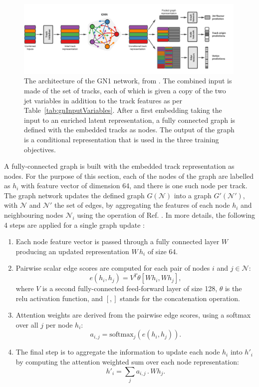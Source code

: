 \begin{figure}[h!]
  \center
  \includegraphics[width=0.99\textwidth]{Images/FTAG/GN/Intro/gnn_architecture.png}
  \caption{The architecture of the GN1 network, from \cite{ATL-PHYS-PUB-2022-027}. The combined input is made of the set of tracks, each of which is given a copy of the two jet variables in addition to the track features as per Table~\ref{tab:gnInputVariables}. After a first embedding taking the input to an enriched latent representation, a fully connected graph is defined with the embedded tracks as nodes. The output of the graph is a conditional representation that is used in the three training objectives.} 
  \label{fig:gnnArchitecture}
\end{figure}

A fully-connected graph is built with the embedded track representation as nodes. For the purpose of this section, each of the nodes of the graph are labelled as $h_i$ with feature vector of dimension 64, and there is one such node per track. The graph network updates the defined graph $G(\mathcal{N})$ into a graph $G'(\mathcal{N}')$, with $\mathcal{N}$ and $\mathcal{N}'$ the set of edges, by aggregating the features of each node $h_i$ and neighbouring nodes $\mathcal{N}_i$ using the operation of Ref. \cite{brody2022how}. In more details, the following 4 steps are applied for a single graph update \cite{ATL-PHYS-PUB-2022-027}:
\begin{enumerate}
  \item Each node feature vector is passed through a fully connected layer $W$ producing an updated representation $W\,h_i$ of size 64.
  \item Pairwise scalar edge scores are computed for each pair of nodes $i$ and $j \in \mathcal{N}$: 
  \begin{equation}
    e\left(h_i, h_j\right) = V^T \theta [Wh_i, Wh_j],
  \end{equation}
  where $V$ is a second fully-connected feed-forward layer of size 128, $\theta$ is the \gls{relu} activation function, and $[,]$ stands for the concatenation operation. 
  \item Attention weights are derived from the pairwise edge scores, using a softmax over all $j$ per node $h_i$:
  \begin{equation}
    a_{i,j} = \textrm{softmax}_j\left(e(h_i, h_j)\right).
  \end{equation}
  \item The final step is to aggregate the information to update each node $h_i$ into $h'_i$ by computing the attention weighted sum over each node representation: 
  \begin{equation}
    h'_i = \sum_j a_{i,j} \,.\, W h_j.
  \end{equation} 
\end{enumerate}

